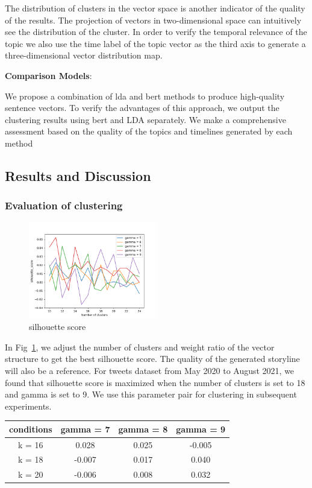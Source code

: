 The distribution of clusters in the vector space is another indicator of the quality of the results. The projection of vectors in two-dimensional space can intuitively see the distribution of the cluster. In order to verify the temporal relevance of the topic we also use the time label of the topic vector as the third axis to generate a three-dimensional vector distribution map.

{\bf Comparison Models}: 

We propose a combination of lda and bert methods to produce high-quality sentence vectors. To verify the advantages of this approach, we output the clustering results using bert and LDA separately. We make a comprehensive assessment based on the quality of the topics and timelines generated by each method
\subsection{Results and Discussion}
\subsubsection{Evaluation of clustering}

\begin{figure}[h]
\centering
\includegraphics[width=0.5\textwidth]{imgs/silhouette_score.png}
\caption{silhouette score}
\label{fig:silhouette score}
\end{figure}

In Fig~\ref{fig:silhouette score}, we adjust the number of clusters and weight ratio of the vector structure to get the best silhouette score. The quality of the generated storyline will also be a reference. For tweets dataset from May 2020 to August 2021, we found that silhouette score is maximized when the number of clusters is set to 18 and gamma is set to 9. We use this parameter pair for clustering in subsequent experiments.

\begin{table}[]
\begin{tabular}{|c|c|c|c|}
\hline
conditions & gamma = 7 & gamma = 8 & gamma = 9 \\ \hline
k = 16     & 0.028     & 0.025     & -0.005    \\ \hline
k = 18     & -0.007    & 0.017     & 0.040     \\ \hline
k = 20     & -0.006    & 0.008     & 0.032     \\ \hline
\end{tabular}
\end{table}

